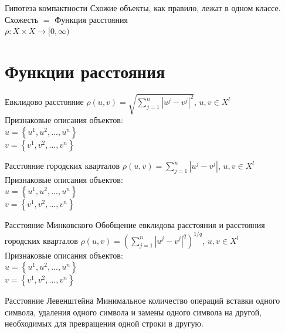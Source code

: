 \documentclass[10pt]{beamer}
\begin{document}
\begin{frame}{Гипотеза компактности}
  \centering
	Схожие объекты, как правило, лежат в одном классе.\\
	\bigbreak
	\alert{Схожесть} $=$ Функция расстояния\\
	\bigbreak
	${\rho: X \times X \rightarrow [0, \infty) }$
\end{frame}

\section{Функции расстояния}

{
\begin{frame}{Евклидово расстояние}
	${\rho (u, v) = \sqrt{\sum\limits_{j=1}^n |u^j - v^j|^2}}$, \hspace{5mm} ${u, v \in X^{l}}$\\
	\bigbreak
	\bigbreak
	Признаковые описания объектов:\\
	${u = \left\{ u^1, u^2, ..., u^n \right\}}$ \\
	${v = \left\{v^1, v^2, ..., v^n \right\} }$ 
\end{frame}
}

{
\begin{frame}{Расстояние городских кварталов}
	${\rho (u, v) = \sum\limits_{j=1}^n |u^j - v^j|}$, \hspace{5mm} ${u, v \in X^{l}}$\\
	\bigbreak
	\bigbreak
	Признаковые описания объектов:\\
	${u = \left\{ u^1, u^2, ..., u^n \right\}}$ \\
	${v = \left\{v^1, v^2, ..., v^n \right\} }$ 
\end{frame}
}

{
\begin{frame}{Расстояние Минковского}
	Обобщение евклидова расстояния и расстояния городских кварталов
	\bigbreak
	${\rho (u, v) = (\sum\limits_{j=1}^n |u^j - v^j|^q)^{1/q}}$, \hspace{5mm} ${u, v \in X^{l}}$\\
	\bigbreak
	\bigbreak
	Признаковые описания объектов:\\
	${u = \left\{ u^1, u^2, ..., u^n \right\}}$ \\
	${v = \left\{v^1, v^2, ..., v^n \right\} }$ 
\end{frame}
}

{
\begin{frame}{Расстояние Левенштейна}
	Минимальное количество операций вставки одного символа, удаления одного символа и замены одного символа на другой, необходимых для превращения одной строки в другую.
\end{frame}
}
\end{document}
